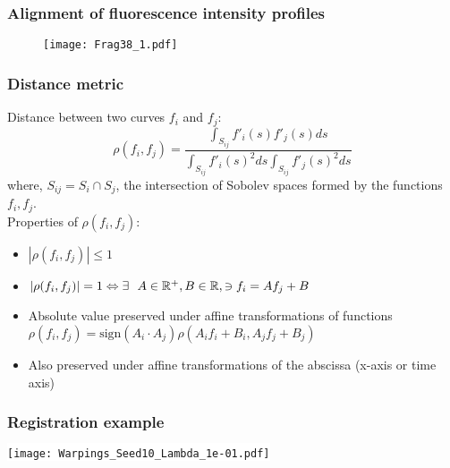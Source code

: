\documentclass[10pt,dvipsnames,table, notes]{beamer} %
\begin{document}
\begin{frame}
\frametitle{Alignment of fluorescence intensity profiles}
\begin{figure}
\texttt{[image: Frag38\_1.pdf]}
\end{figure}

\end{frame}

\begin{frame}
\frametitle{Distance metric}
Distance between two curves $f_i$ and $f_j$:
\[ \rho(f_i, f_j) = \frac{\int _{S_{ij}}f'_i(s)f'_j(s) ds}{\int _{S_{ij}}f'_i(s)^2 ds \int _{S_{ij}}f'_j(s)^2 ds} \]
where, $S_{ij} = S_i \cap S_j$, the intersection of Sobolev spaces formed by the functions $f_i, f_j$.\\
Properties of $\rho(f_i, f_j)$:
\begin{itemize}
\item $|\rho(f_i, f_j)| \leq 1$
\item $|\rho(f_i, f_j)| = 1 \Leftrightarrow \exists \ \ A \in \mathbb{R} ^+, B \in \mathbb{R}, \ni f_i = Af_j + B$
\item Absolute value preserved under affine transformations of functions \\
$\rho(f_i, f_j) = \text{sign}(A_i\cdot A_j) \rho(A_if_i + B_i, A_jf_j + B_j)$
\item Also preserved under affine transformations of the abscissa (x-axis or time axis)
\end{itemize}


\end{frame}

\begin{frame}
\frametitle{Registration example}
\begin{center}
\colorbox{white}{\texttt{[image: Warpings\_Seed10\_Lambda\_1e-01.pdf]}}
\end{center}

\end{frame}
\end{document}
